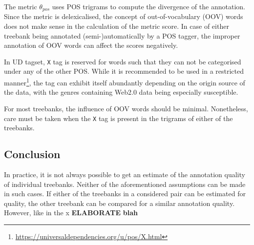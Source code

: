 The metric \(\theta_{pos}\) uses POS trigrams to compute the divergence of the annotation. Since the metric is delexicalised, the concept of out-of-vocabulary (OOV) words does not make sense in the calculation of the metric score. In case of either treebank being annotated (semi-)automatically by a POS tagger, the improper annotation of OOV words can affect the scores negatively.

In UD tagset, \verb|X| tag is reserved for words such that they can not be categorised under any of the other POS. While it is recommended to be used in a restricted manner\footnote{\url{https://universaldependencies.org/u/pos/X.html}}, the tag can exhibit itself abundantly depending on the origin source of the data, with the genres containing Web2.0 data being especially susceptible.

For most treebanks, the influence of OOV words should be minimal. Nonetheless, care must be taken when the \verb|X| tag is present in the trigrams of either of the treebanks.

\subsection{Conclusion}

In practice, it is not always possible to get an estimate of the annotation quality of individual treebanks. Neither of the aforementioned assumptions can be made in such cases. If either of the treebanks in a considered pair can be estimated for quality, the other treebank can be compared for a similar annotation quality. However, like in the x 
\textbf{ELABORATE}
\textbf{blah}